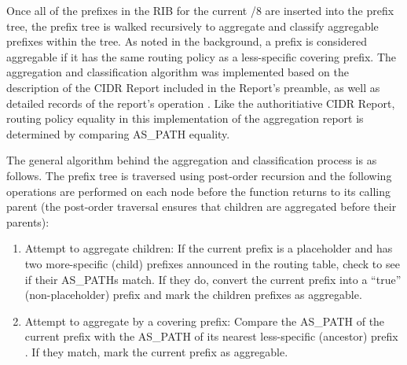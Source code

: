 
Once all of the prefixes in the RIB for the current /8 are inserted into the prefix tree, the prefix tree is walked recursively to aggregate and classify aggregable prefixes within the tree. As noted in the background, a prefix is considered aggregable if it has the same routing policy as a less-specific covering prefix. The aggregation and classification algorithm was implemented based on the description of the CIDR Report included in the Report's preamble, as well as detailed records of the report's operation \cite{CIDR Report details}. Like the authoritiative CIDR Report, routing policy equality in this implementation of the aggregation report is determined by comparing AS\_PATH equality.

The general algorithm behind the aggregation and classification process is as follows. The prefix tree is traversed using post-order recursion and the following operations are performed on each node before the function returns to its calling parent (the post-order traversal ensures that children are aggregated before their parents):
\begin{enumerate}
\item{Attempt to aggregate children: If the current prefix is a placeholder and has two more-specific (child) prefixes announced in the routing table, check to see if their AS\_PATHs match. If they do, convert the current prefix into a ``true'' (non-placeholder) prefix and mark the children prefixes as aggregable.}
\item{Attempt to aggregate by a covering prefix: Compare the AS\_PATH of the current prefix with the AS\_PATH of its nearest less-specific (ancestor) prefix . If they match, mark the current prefix as aggregable.}
\end{enumerate}

%

